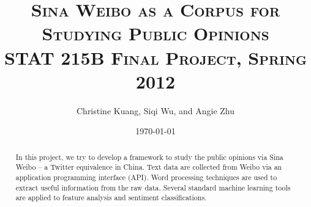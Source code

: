 \documentclass[11pt]{article}
\title{\scshape Sina Weibo as a Corpus for Studying Public Opinions
	\\{\Large STAT 215B Final Project, Spring 2012} }
\author{Christine Kuang, Siqi Wu, and Angie Zhu}
\date{\today} %
\newcommand{\1}[1]{{\mathbf 1}\left\{#1\right\}}        %
\begin{document}
\setlength\footskip{0.5in}


\lstset{
showspaces=false, 
language=R, 
basicstyle=\ttfamily, 
tabsize=3, 
showstringspaces=false, 
columns=flexible%
}

\maketitle








\begin{abstract}
In this project, we try to develop a framework to study the public opinions via Sina Weibo -- a Twitter equivalence in China. Text data are collected from  Weibo via an application programming interface (API). Word processing techniques are used to extract useful information from the raw data. Several standard machine learning tools are applied to feature analysis and sentiment classifications. 
\end{abstract}
\end{document}
